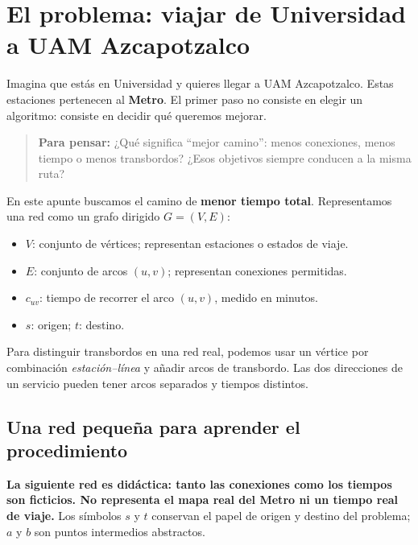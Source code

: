 \documentclass[11pt,letterpaper]{article}
\newcommand{\pregunta}[1]{\begin{quote}\color{verde}\textbf{Para pensar:} #1\end{quote}}
\begin{document}
\section{El problema: viajar de Universidad a UAM Azcapotzalco}
Imagina que estás en Universidad y quieres llegar a UAM Azcapotzalco. Estas estaciones pertenecen al \textbf{Metro}. El primer paso no consiste en elegir un algoritmo: consiste en decidir qué queremos mejorar.
\pregunta{¿Qué significa ``mejor camino'': menos conexiones, menos tiempo o menos transbordos? ¿Esos objetivos siempre conducen a la misma ruta?}

En este apunte buscamos el camino de \textbf{menor tiempo total}. Representamos una red como un grafo dirigido $G=(V,E)$:
\begin{itemize}
\item $V$: conjunto de vértices; representan estaciones o estados de viaje.
\item $E$: conjunto de arcos $(u,v)$; representan conexiones permitidas.
\item $c_{uv}$: tiempo de recorrer el arco $(u,v)$, medido en minutos.
\item $s$: origen; $t$: destino.
\end{itemize}
Para distinguir transbordos en una red real, podemos usar un vértice por combinación \emph{estación--línea} y añadir arcos de transbordo. Las dos direcciones de un servicio pueden tener arcos separados y tiempos distintos.

\subsection{Una red pequeña para aprender el procedimiento}
\textbf{La siguiente red es didáctica: tanto las conexiones como los tiempos son ficticios. No representa el mapa real del Metro ni un tiempo real de viaje.} Los símbolos $s$ y $t$ conservan el papel de origen y destino del problema; $a$ y $b$ son puntos intermedios abstractos.
\end{document}
